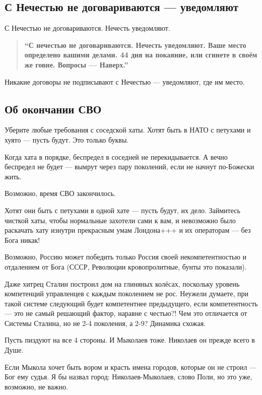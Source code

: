 \documentclass[11pt,a4paper]{article}
\theoremstyle{definition}
\theoremstyle{remark}
\begin{document}
{\subsection{С Нечестью не договариваются — уведомляют}

С Нечестью не договариваются. Нечесть уведомляют.

\begin{quote}
\textbf{``С нечестью не договариваются. Нечесть уведомляют. Ваше место определено 
вашими делами. 44 дня на покаяние, или сгинете в своём же говне. Вопросы — Наверх.''}
\end{quote}

Никакие договоры не подписывают с Нечестью — уведомляют, где им место.

\subsection{Об окончании СВО}

Уберите любые требования с соседской хаты. Хотят быть в НАТО с петухами и хуято — 
пусть будут. Это только буквы.

Когда хата в порядке, беспредел в соседней не перекидывается. А вечно беспредел 
не будет — вымрут через пару поколений, если не начнут по-Божески жить.

Возможно, время СВО закончилось.

Хотят они быть с петухами в одной хате — пусть будут, их дело. Займитесь чисткой 
хаты, чтобы нормальные захотели сами к вам, и невозможно было раскачать хату 
изнутри прекрасным умам Лондона+++ и их операторам — без Бога никак!

Возможно, Россию может победить только Россия своей некомпетентностью и отдалением 
от Бога (СССР, Революции кровопролитные, бунты это показали).

Даже хитрец Сталин построил дом на глиняных колёсах, поскольку уровень компетенций 
управленцев с каждым поколением не рос. Неужели думаете, при такой системе следующий 
будет компетентнее предыдущего, если компетентность — это не самый решающий фактор, 
наравне с честью?! Чем это отличается от Системы Сталина, но не 2-4 поколения, а 2-9? 
Динамика схожая.

Пусть пиздуют на все 4 стороны. И Мыколаев тоже. Николаев он прежде всего в Душе.

Если Мыкола хочет быть вором и красть имена городов, которые он не строил — Бог 
ему судья. Я бы назвал город: Николаев-Мыколаев, слово Поли, но это уже, возможно, 
не важно.

}
\end{document}
